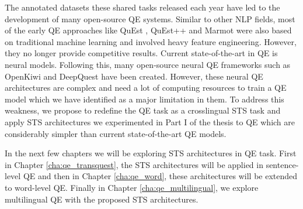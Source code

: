 The annotated datasets these shared tasks released each year have led to the development of many open-source QE systems. Similar to other NLP fields, most of the early QE approaches like QuEst \cite{specia-etal-2013-quest}, QuEst++ \cite{specia-etal-2015-multi} and Marmot \cite{logacheva-etal-2016-marmot} were also based on traditional machine learning and involved heavy feature engineering. However, they no longer provide competitive results. Current state-of-the-art in QE is neural models. Following this, many open-source neural QE frameworks such as OpenKiwi \cite{kepler-etal-2019-openkiwi} and DeepQuest \cite{ive-etal-2018-deepquest} have been created. However, these neural QE architectures are complex and need a lot of computing resources to train a QE model which we have identified as a major limitation in them. To address this weakness, we propose to redefine the QE task as a crosslingual STS task and apply STS architectures we experimented in Part I of the thesis to QE which are considerably simpler than current state-of-the-art QE models.

In the next few chapters we will be exploring STS architectures in QE task. First in Chapter \ref{cha:qe_transquest}, the STS architectures will be applied in sentence-level QE and then in Chapter \ref{cha:qe_word}, these architectures will be extended to word-level QE. Finally in Chapter \ref{cha:qe_multilingual}, we explore multilingual QE with the proposed STS architectures.
